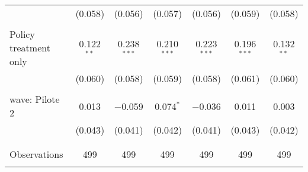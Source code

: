\begin{tabular}{@{\extracolsep{5pt}}lcccccc}
  & (0.058) & (0.056) & (0.057) & (0.056) & (0.059) & (0.058) \\ 
  & & & & & & \\ 
 Policy treatment only & 0.122$^{**}$ & 0.238$^{***}$ & 0.210$^{***}$ & 0.223$^{***}$ & 0.196$^{***}$ & 0.132$^{**}$ \\ 
  & (0.060) & (0.058) & (0.059) & (0.058) & (0.061) & (0.060) \\ 
  & & & & & & \\ 
 wave: Pilote 2 & 0.013 & $-$0.059 & 0.074$^{*}$ & $-$0.036 & 0.011 & 0.003 \\ 
  & (0.043) & (0.041) & (0.042) & (0.041) & (0.043) & (0.042) \\ 
  & & & & & & \\ 
\hline \\[-1.8ex] 

Observations & 499 & 499 & 499 & 499 & 499 & 499 \\ 
\hline 
\hline \\[-1.8ex] 
\end{tabular} 